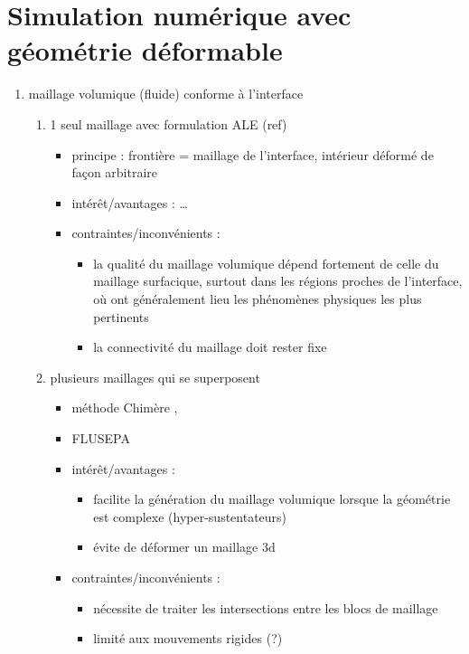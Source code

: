 \section{Simulation numérique avec géométrie déformable}%
\begin{enumerate}
	\item maillage volumique (fluide) conforme à l'interface
	\begin{enumerate}
		\item \label{item:methodo_bodyfitted_ALE} 1 seul maillage  avec formulation ALE (ref)
		\begin{itemize}
			\item principe : frontière = maillage de l'interface, intérieur déformé de façon arbitraire
			\item intérêt/avantages : \ldots
			\item contraintes/inconvénients : 
			\begin{itemize}
				\item la qualité du maillage volumique dépend fortement de celle du maillage surfacique, surtout dans les régions proches de l'interface, où ont généralement lieu les phénomènes physiques les plus pertinents
				\item la connectivité du maillage doit rester fixe
			\end{itemize}
		\end{itemize}
		
		\item plusieurs maillages  qui se superposent
		\begin{itemize}
			\item méthode Chimère \cite{meakin1989, wang200}, \item FLUSEPA \cite{brenner1991}
			\item intérêt/avantages : 
			\begin{itemize}
				\item facilite la génération du maillage volumique lorsque la géométrie est complexe (\eg hyper-sustentateurs)
				\item évite de déformer un maillage 3d
			\end{itemize}						
			\item contraintes/inconvénients : 
			\begin{itemize}
				\item nécessite de traiter les intersections entre les blocs de maillage
				\item limité aux mouvements rigides (?)
			\end{itemize}
		\end{itemize}
	\end{enumerate}
	

\end{enumerate}
